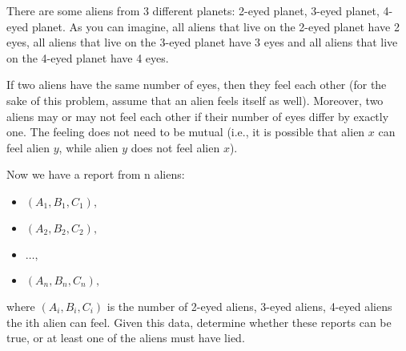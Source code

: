 There are some aliens from 3 different planets:
2-eyed planet, 3-eyed planet, 4-eyed planet.
As you can imagine, all aliens that live on the 2-eyed planet have 2 eyes,
all aliens that live on the 3-eyed planet have 3 eyes and all aliens that live on the 4-eyed planet have 4 eyes.

If two aliens have the same number of eyes,
then they feel each other (for the sake of this problem, assume that an alien feels itself as well).
Moreover, two aliens may or may not feel each other if their number of eyes differ by exactly one. The feeling does not need to be mutual (i.e., it is possible that alien $x$ can feel alien $y$, while alien $y$ does not feel alien $x$).

Now we have a report from n aliens:

\begin{itemize}
	\item $(A_1, B_1, C_1),$
	\item $(A_2, B_2, C_2),$
	\item $\ldots,$
	\item $(A_n, B_n, C_n),$
\end{itemize}

where $(A_i,B_i,C_i)$ is the number of 2-eyed aliens,
3-eyed aliens, 4-eyed aliens the ith alien can feel.
Given this data,  determine whether these reports can be true, or at least one of the aliens must have lied. 
